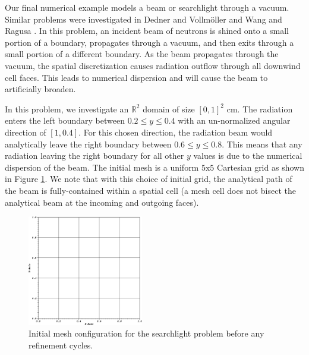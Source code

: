 Our final numerical example models a beam or searchlight through a vacuum. Similar problems were investigated in Dedner and Vollm{\"o}ller \cite{dedner2002adaptive} and Wang and Ragusa \cite{wang2011standard}. In this problem, an incident beam of neutrons is shined onto a small portion of a boundary, propagates through a vacuum, and then exits through a small portion of a different boundary. As the beam propagates through the vacuum, the spatial discretization causes radiation outflow through all downwind cell faces. This leads to numerical dispersion and will cause the beam to artificially broaden.

In this problem, we investigate an $\mathbb{R}^2$ domain of size $[0,1]^2$ cm. The radiation enters the left boundary between $0.2 \leq y \leq 0.4$ with an un-normalized angular direction of $[1,0.4]$. For this chosen direction, the radiation beam would analytically leave the right boundary between $0.6 \leq y \leq 0.8$. This means that any radiation leaving the right boundary for all other $y$ values is due to the numerical dispersion of the beam. The initial mesh is a uniform $5 \text{x} 5$ Cartesian grid as shown in Figure \ref{fig::BF_Results_SL_starting_mesh}. We note that with this choice of initial grid, the analytical path of the beam is fully-contained within a spatial cell (a mesh cell does not bisect the analytical beam at the incoming and outgoing faces). 

\begin{figure}
\centering
\includegraphics[width=0.45\textwidth]{figures/sec_BF/searchlight_starting_mesh.eps}
\caption{Initial mesh configuration for the searchlight problem before any refinement cycles.}
\label{fig::BF_Results_SL_starting_mesh}
\end{figure}


